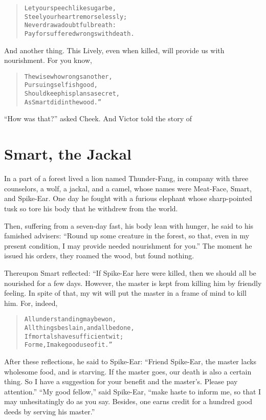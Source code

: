 \documentclass[article, twoside, 14pt]{memoir}
\renewenvironment{verbatim}{%
\begin{quote}%
\vskip -10pt%
\begin{alltt}\normalfont\large}{\end{alltt}%
\end{quote}%
\vskip -10pt
} %
\begin{document}
\begin{verbatim}
Let your speech like sugar be,
Steel your heart remorselessly;
Never draw a doubtful breath:
Pay for suffered wrongs with death.
\end{verbatim}
And another thing. This Lively, even when killed, will provide us
with nourishment. For you know,

\begin{verbatim}
The wise who wrongs another,
    Pursuing selfish good,
Should keep his plans a secret,
    As Smart did in the wood.”
\end{verbatim}
``How was that?'' asked Cheek. And Victor told the story of

\chapter{Smart, the Jackal}

\label{s24}

In a part of a forest lived a lion named Thunder-Fang, in
company with three counselors, a wolf, a jackal, and a camel, whose
names were Meat-Face, Smart, and Spike-Ear. One day he fought with
a furious elephant whose sharp-pointed tusk so tore his body that
he withdrew from the world.

Then, suffering from a seven-day fast, his body lean with hunger,
he said to his famished advisers:
``Round up some creature in the forest, so that, even in my present condition, I may provide needed nourishment for you.''
The moment he issued his orders, they roamed the wood, but found
nothing.

Thereupon Smart reflected: “If Spike-Ear here were killed, then we
should all be nourished for a few days. However, the master is kept
from killing him by friendly feeling. In spite of that, my wit will
put the master in a frame of mind to kill him. For, indeed,

\begin{verbatim}
All understanding may be won,
All things be slain, and all be done,
If mortals have sufficient wit;
For me, I make good use of it.”
\end{verbatim}
After these reflections, he said to Spike-Ear:
``Friend Spike-Ear, the master lacks wholesome food, and is starving. If the master goes, our death is also a certain thing. So I have a suggestion for your benefit and the master's. Please pay attention.''
``My good fellow,'' said Spike-Ear,
``make haste to inform me, so that I may unhesitatingly do as you say. Besides, one earns credit for a hundred good deeds by serving his master.''
\end{document}
